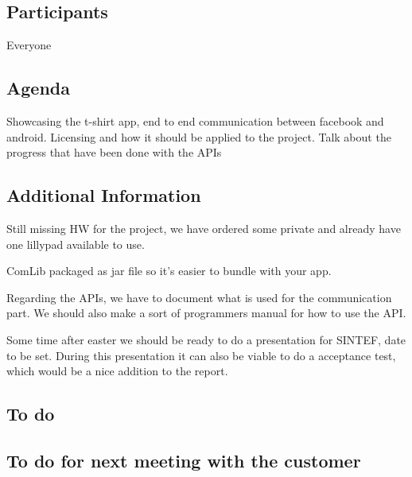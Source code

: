 \subsection{Participants}

Everyone

\subsection{Agenda}

Showcasing the t-shirt app, end to end communication between facebook and android.
Licensing and how it should be applied to the project.
Talk about the progress that have been done with the APIs

\subsection{Additional Information}
Still missing HW for the project, we have ordered some private and already have one lillypad available to use.

ComLib packaged as jar file so it's easier to bundle with your app.

Regarding the APIs, we have to document what is used for the communication part. We should also make a sort of programmers manual for how to use the API.

Some time after easter we should be ready to do a presentation for SINTEF, date to be set. During this presentation it can also be viable to do a acceptance test, which would be a nice addition to the report.

\subsection{To do}

\subsection{To do for next meeting with the customer}